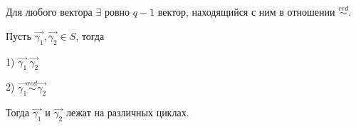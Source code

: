 Для любого вектора $\exists$ ровно $q-1$ вектор, находящийся с ним в отношении $\stackrel{red}{\sim}$.

\thr
Пусть $\vec{\gamma_1}, \vec{\gamma_2} \in S$, тогда

1) $\vec{\gamma_1} ~ \vec{\gamma_2}$

2) $\vec{\gamma_1} \stackrel{red}{\sim} \vec{\gamma_2}$

Тогда $\vec{\gamma_1}$ и $\vec{\gamma_2}$ лежат на различных циклах.
